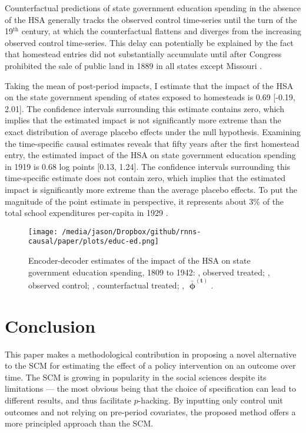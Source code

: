 Counterfactual predictions of state government education spending in the absence of the HSA generally tracks the observed control time-series until the turn of the 19$^\text{th}$ century, at which the counterfactual flattens and diverges from the increasing observed control time-series. This delay can potentially be explained by the fact that homestead entries did not substantially accumulate until after Congress prohibited the sale of public land in 1889 in all states except Missouri \citep{gates1941land,gates1979federal}. 

Taking the mean of post-period impacts, I estimate that the impact of the HSA on the state government spending of states exposed to homesteads is 0.69 [-0.19, 2.01]. The confidence intervals surrounding this estimate contains zero, which implies that the estimated impact is not significantly more extreme than the exact distribution of average placebo effects under the null hypothesis. Examining the time-specific causal estimates reveals that fifty years after the first homestead entry, the estimated impact of the HSA on state government education spending in 1919 is 0.68 log points [0.13, 1.24]. The confidence intervals surrounding this time-specific estimate does not contain zero, which implies that the estimated impact is significantly more extreme than the average placebo effects. To put the magnitude of the point estimate in perspective, it represents about 3\% of the total school expenditures per-capita in 1929 \citep{snyder2010digest}.

\begin{figure}[htbp]
	\centering
	\texttt{[image: /media/jason/Dropbox/github/rnns-causal/paper/plots/educ-ed.png]}
	\caption{Encoder-decoder estimates of the impact of the HSA on state government education spending, 1809 to 1942:		{\color{Darjeeling15}{\sampleline{}}}, observed treated;
		{}, observed control;
		{}, counterfactual treated;
		{}, $\boldsymbol{\bar{\upphi}^{(t)}}$.\label{educ-ed}} 
\end{figure}

\section{Conclusion} \label{ch3-conclusion}

This paper makes a methodological contribution in proposing a novel alternative to the SCM for estimating the effect of a policy intervention on an outcome over time. The SCM is growing in popularity in the social sciences despite its limitations --- the most obvious being that the choice of specification can lead to different results, and thus facilitate $p$-hacking. By inputting only control unit outcomes and not relying on pre-period covariates, the proposed method offers a more principled approach than the SCM. 

